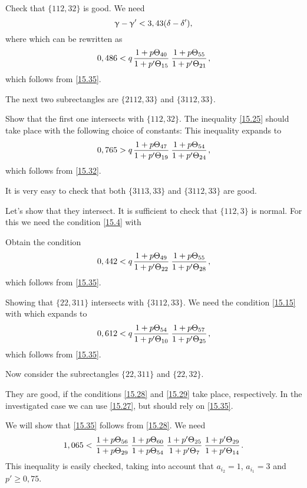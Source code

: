 Check that $\{112, 32\}$ is good. We need
\begin{equation*}
	\upgamma - \upgamma' < 3,43 (\delta - \delta'),
\end{equation*}
where
which can be rewritten as
\begin{equation*}
	0,486 < q \up{40}{15} \up{55}{21},
\end{equation*}
which follows from \ref{15.35}.

The next two subrectangles are $\{2112, 33\}$ and $\{3112, 33\}$.

Show that the first one intersects with $\{112, 32\}$.
The inequality \ref{15.25} should take place with the following choice of constants:
This inequality expands to
\begin{equation*}
	0,765 > q \up{47}{19} \up{54}{24},
\end{equation*}
which follows from \ref{15.32}.

It is very easy to check that both $\{3113, 33\}$ and $\{3112, 33\}$ are good.

Let's show that they intersect. It is sufficient to check that $\{112, 3\}$ is normal.
For this we need the condition \ref{15.4} with

Obtain the condition
\begin{equation*}
	0,442 < q \up{49}{22} \up{55}{28},
\end{equation*}
which follows from \ref{15.35}.

Showing that $\{22, 311\}$ intersects with $\{3112, 33\}$.
We need the condition \ref{15.15} with
which expands to
\begin{equation*}
	0,612 < q \up{54}{10} \up{57}{25},
\end{equation*}
which follows from \ref{15.35}.

Now consider the subrectangles $\{22, 311\}$ and $\{22, 32\}$.

They are good, if the conditions \ref{15.28} and \ref{15.29} take place, respectively.
In the investigated case we can use \ref{15.27}, but should rely on \ref{15.35}.

We will show that \ref{15.35} follows from \ref{15.28}.
We need
\begin{equation*}
	1,065 < \uu{56}{29} \uu{60}{54} \pp{25}{7} \pp{29}{14}.
\end{equation*}
This inequality is easily checked,
taking into account that $a_{i_2} = 1$, $a_{i_1} = 3$ and $p' \geqslant 0,75$.

